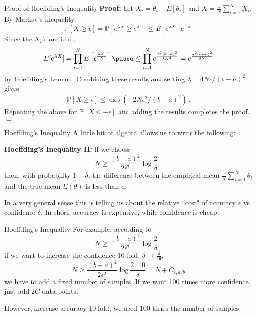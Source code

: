 \documentclass[10pt, table, handout]{beamer}
\newcommand{\bP}{\ensuremath{\mathbb{P}}}
\begin{document}
\begin{frame}[fragile]{Proof of Hoeffding's Inequality}
\textbf{Proof:} Let $X_i = \theta_i - E[\theta_i]$ and $X = \frac1N\sum_{i=1}^N X_i$. \pause By Markov's inequality,
$$
\bP[X\geq \epsilon] = \bP\left[ e^{\lambda X} \geq e^{\lambda \epsilon} \right] \leq E[e^{\lambda X}]e^{-\lambda \epsilon }
$$\pause
Since the $X_i$'s are i.i.d., 
$$
E[e^{\lambda X}] = \prod_{i=1}^N E\left[e^{\frac{\lambda X_i}N}\right]\pause
\leq
\prod_{i=1}^N e^{\frac{\lambda^2(b-a)^2 }{8N^2}} = e^{\frac{\lambda^2(b-a)^2 }{8N}}
$$
by Hoeffding's Lemma. \pause Combining these results and setting $\lambda = 4N\epsilon/(b-a)^2$ gives
$$
\bP[X\geq \epsilon] \leq  \exp\left(-2N\epsilon^2/(b-a)^2\right)\,.
$$
Repeating the above for $\bP[X\leq -\epsilon] $ and adding the results completes the proof. $\Box$
\end{frame}








\begin{frame}[fragile]{Hoeffding's Inequality}
A little bit of algebra allows us to write the following:\newline

\textbf{Hoeffding's Inequality II:} If we choose 
$$
N \geq \frac{(b-a)^2}{2\epsilon^2}\log \frac{2}{\delta}\,,
$$
then, with probability $1-\delta$, the difference between the empirical mean $\frac{1}{N}\sum_{i=1}^N \theta_i$ and the true mean $E(\theta)$ is less than $\epsilon$. \pause

In a very general sense this is telling us about the relative ``cost" of accuracy $\epsilon$ vs confidence $\delta$. In short, accuracy is expensive, while confidence is cheap.
\end{frame}





\begin{frame}[fragile]{Hoeffding's Inequality}
For example, according to
$$
N \geq \frac{(b-a)^2}{2\epsilon^2}\log \frac{2}{\delta}\,,
$$
if we want to increase the confidence 10-fold, $\delta\to\frac{\delta}{10}$,
$$
N \geq \frac{(b-a)^2}{2\epsilon^2}\log \frac{2\cdot 10}{\delta} = N+C_{\epsilon, a,b}
$$
we have to add a fixed number of samples. If we want 100 times more confidence, just add $2C$ data points. \pause \newline

However, increase accuracy 10-fold, we need 100 times the number of samples. 
\end{frame}
\end{document}

